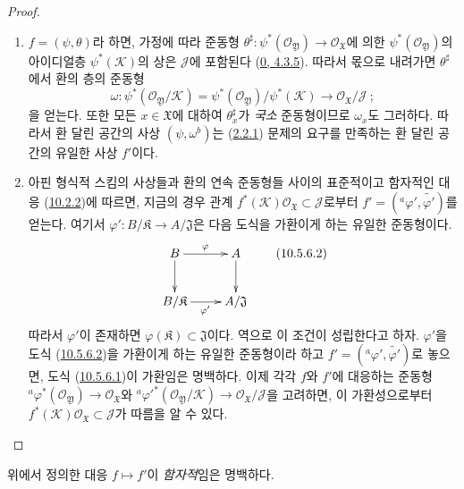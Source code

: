 \begin{proof}
\medskip\noindent
\begin{enumerate}
  \item[{\upshape(i)}] $f=(\psi,\theta)$라 하면, 가정에 따라 준동형
    $\theta^\sharp:\psi^*(\mathscr{O}_{\mathfrak{Y}})\to
    \mathscr{O}_{\mathfrak{X}}$에 의한
    $\psi^*(\mathscr{O}_{\mathfrak{Y}})$의 아이디얼층
    $\psi^*(\mathscr{K})$의 상은 $\mathscr{J}$에 포함된다
    (\hyperref[0.4.3.5-ko]{0, 4.3.5}). 따라서 몫으로 내려가면
    $\theta^\sharp$에서 환의 층의 준동형
    \[
      \omega:\psi^*(\mathscr{O}_{\mathfrak{Y}}/\mathscr{K})
      =\psi^*(\mathscr{O}_{\mathfrak{Y}})/\psi^*(\mathscr{K})
      \to\mathscr{O}_{\mathfrak{X}}/\mathscr{J}~;
    \]
    을 얻는다. 또한 모든 $x\in\mathfrak{X}$에 대하여
    $\theta_x^\sharp$가 \emph{국소} 준동형이므로 $\omega_x$도 그러하다.
    따라서 환 달린 공간의 사상 $(\psi,\omega^b)$는
    (\hyperref[I.2.2.1-ko]{2.2.1}) 문제의 요구를 만족하는 환 달린 공간의
    유일한 사상 $f'$이다.
  \item[{\upshape(ii)}] 아핀 형식적 스킴의 사상들과 환의 연속 준동형들
    사이의 표준적이고 함자적인 대응
    (\hyperref[I.10.2.2-ko]{10.2.2})에 따르면, 지금의 경우 관계
    $f^*(\mathscr{K})\mathscr{O}_{\mathfrak{X}}\subset\mathscr{J}$로부터
    $f'=({}^a\varphi',\widetilde{\varphi'})$를 얻는다. 여기서
    $\varphi':B/\mathfrak{K}\to A/\mathfrak{J}$은 다음 도식을 가환이게
    하는 유일한 준동형이다.
    \[
      \label{I.10.5.6.2-ko}
      \xymatrix{
        B\ar[r]^\varphi\ar[d] & A\ar[d]\\
        B/\mathfrak{K}\ar[r]_{\varphi'} & A/\mathfrak{J}
      }
      \tag{10.5.6.2}
    \]
    따라서 $\varphi'$이 존재하면
    $\varphi(\mathfrak{K})\subset\mathfrak{J}$이다. 역으로 이 조건이
    성립한다고 하자. $\varphi'$을 도식
    (\hyperref[I.10.5.6.2-ko]{10.5.6.2})을 가환이게 하는 유일한
    준동형이라 하고 $f'=({}^a\varphi',\widetilde{\varphi'})$로 놓으면,
    도식 (\hyperref[I.10.5.6.1-ko]{10.5.6.1})이 가환임은 명백하다. 이제
    각각 $f$와 $f'$에 대응하는 준동형
    ${}^a\varphi^*(\mathscr{O}_{\mathfrak{Y}})\to
    \mathscr{O}_{\mathfrak{X}}$와
    ${}^a{\varphi'}^*(\mathscr{O}_{\mathfrak{Y}}/\mathscr{K})\to
    \mathscr{O}_{\mathfrak{X}}/\mathscr{J}$을 고려하면, 이 가환성으로부터
    $f^*(\mathscr{K})\mathscr{O}_{\mathfrak{X}}\subset\mathscr{J}$가
    따름을 알 수 있다.
\end{enumerate}
\end{proof}

위에서 정의한 대응 $f\mapsto f'$이 \emph{함자적}임은 명백하다.

